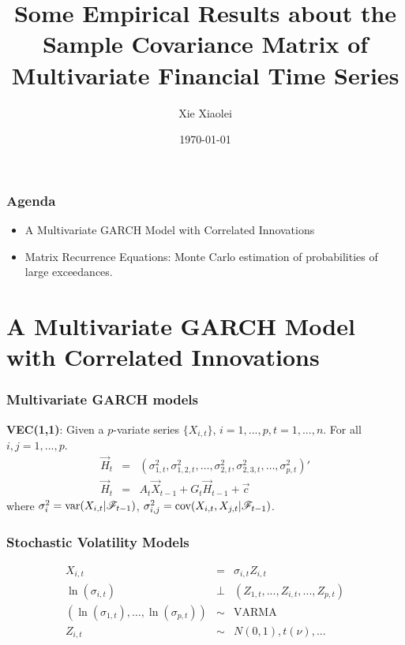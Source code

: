 \documentclass{beamer}
\title{Some Empirical Results about the Sample Covariance Matrix of
  Multivariate Financial Time Series}
\author{Xie Xiaolei} %
\institute[UCPH] %
{
University of Copenhagen \\ %
\medskip
\textit{xie@math.ku.dk} %
}
\date{\today} %
\begin{document}
\begin{frame}
\titlepage %
\end{frame}


\begin{frame}
  \frametitle{Agenda}
  \begin{itemize}
  \item A Multivariate GARCH Model with Correlated Innovations
  \item Matrix Recurrence Equations: Monte Carlo estimation of
    probabilities of large exceedances.
  \end{itemize}
\end{frame}

\section{A Multivariate GARCH Model with Correlated Innovations}
\begin{frame}
  \frametitle{Multivariate GARCH models}
  {\bf VEC(1,1)}:
  Given a $p$-variate series $\{X_{i, t}\}$, $i=1,...,p,
  t=1,...,n$. For all $i, j = 1, ..., p$.
  \begin{eqnarray*}
    \vec H_t &=& (\sigma_{1,t}^2, \sigma_{1,2, t}^2, \dots, \sigma_{2,t}^2,
    \sigma_{2,3, t}^2, \dots, \sigma_{p,t}^2)' \\
    \vec H_t &=& A_t \vec X_{t-1} + G_t \vec H_{t-1} + \vec c
  \end{eqnarray*}
  where $\sigma_i^2 = \text{var}(X_{i, t} | \mathscr F_{t-1})$, $\sigma_{i,j}^2 =
  \text{cov}{(}X_{i,t}, X_{j,t} | \mathscr F_{t-1})$.
\end{frame}

\begin{frame}
  \frametitle{Stochastic Volatility Models}
  \begin{eqnarray*}
    X_{i,t} &=& \sigma_{i, t} Z_{i, t} \\
    \ln(\sigma_{i,t}) &\bot& (Z_{1, t}, ..., Z_{i, t}, ..., Z_{p,t}) \\
    (\ln(\sigma_{1,t}), \dots, \ln(\sigma_{p,t})) &\sim& \text{VARMA}
    \\
    Z_{i,t} &\sim& N(0,1), t(\nu), ...
  \end{eqnarray*}
\end{frame}
\end{document}
